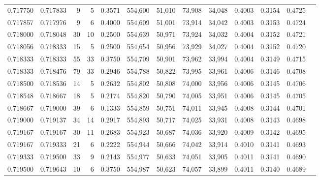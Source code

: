 \begin{tabular}{rrrrrrrrrrrrr}
0.717750 & 0.717833 &     9 &   5 &                                     0.3571 & 554,600 &  51,010 &  73,908 &  34,048 & 0.4003 & 0.3154 & 0.4725 \\
0.717857 & 0.717976 &     9 &   6 &                                     0.4000 & 554,609 &  51,001 &  73,914 &  34,042 & 0.4003 & 0.3153 & 0.4724 \\
0.718000 & 0.718048 &    30 &  10 &                                     0.2500 & 554,639 &  50,971 &  73,924 &  34,032 & 0.4004 & 0.3152 & 0.4721 \\
0.718056 & 0.718333 &    15 &   5 &                                     0.2500 & 554,654 &  50,956 &  73,929 &  34,027 & 0.4004 & 0.3152 & 0.4720 \\
0.718333 & 0.718333 &    55 &  33 &                                     0.3750 & 554,709 &  50,901 &  73,962 &  33,994 & 0.4004 & 0.3149 & 0.4715 \\
0.718333 & 0.718476 &    79 &  33 &                                     0.2946 & 554,788 &  50,822 &  73,995 &  33,961 & 0.4006 & 0.3146 & 0.4708 \\
0.718500 & 0.718536 &    14 &   5 &                                     0.2632 & 554,802 &  50,808 &  74,000 &  33,956 & 0.4006 & 0.3145 & 0.4706 \\
0.718548 & 0.718667 &    18 &   5 &                                     0.2174 & 554,820 &  50,790 &  74,005 &  33,951 & 0.4006 & 0.3145 & 0.4705 \\
0.718667 & 0.719000 &    39 &   6 &                                     0.1333 & 554,859 &  50,751 &  74,011 &  33,945 & 0.4008 & 0.3144 & 0.4701 \\
0.719000 & 0.719137 &    34 &  14 &                                     0.2917 & 554,893 &  50,717 &  74,025 &  33,931 & 0.4008 & 0.3143 & 0.4698 \\
0.719167 & 0.719167 &    30 &  11 &                                     0.2683 & 554,923 &  50,687 &  74,036 &  33,920 & 0.4009 & 0.3142 & 0.4695 \\
0.719167 & 0.719333 &    21 &   6 &                                     0.2222 & 554,944 &  50,666 &  74,042 &  33,914 & 0.4010 & 0.3141 & 0.4693 \\
0.719333 & 0.719500 &    33 &   9 &                                     0.2143 & 554,977 &  50,633 &  74,051 &  33,905 & 0.4011 & 0.3141 & 0.4690 \\
0.719500 & 0.719643 &    10 &   6 &                                     0.3750 & 554,987 &  50,623 &  74,057 &  33,899 & 0.4011 & 0.3140 & 0.4689 \\

\end{tabular}
